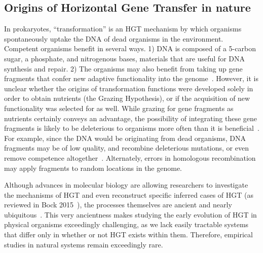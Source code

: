 \documentclass[letterpaper]{article}
\begin{document}
\subsection{Origins of Horizontal Gene Transfer in nature}
In prokaryotes, ``transformation'' is an HGT mechanism by which organisms spontaneously uptake the DNA of dead organisms in the environment. Competent organisms benefit in several ways. 1) DNA is composed of a 5-carbon sugar, a phosphate, and nitrogenous bases, materials that are useful for DNA synthesis and repair. 2) The organisms may also benefit from taking up gene fragments that confer new adaptive functionality into the genome~\cite{vos_why_2009}. However, it is unclear whether the origins of transformation functions were developed solely in order to obtain nutrients (the Grazing Hypothesis), or if the acquisition of new functionality was selected for as well. While grazing for gene fragments as nutrients certainly conveys an advantage, the possibility of integrating these gene fragments is likely to be deleterious to organisms more often than it is beneficial~\cite{redfield_evolution_1997}. For example, since the DNA would be originating from dead organisms, DNA fragments may be of low quality, and recombine deleterious mutations, or even remove competence altogether~\cite{redfield_evolution_1997}. Alternately, errors in homologous recombination may apply fragments to random locations in the genome.    

Although advances in molecular biology are allowing researchers to investigate the mechanisms of HGT and even reconstruct specific inferred cases of HGT (as reviewed in Bock 2015~\cite{bock_witnessing_2015}), the processes themselves are ancient and nearly ubiquitous~\cite{soucy_horizontal_2015}. This very ancientness makes studying the early evolution of HGT in physical organisms exceedingly challenging, as we lack easily tractable systems that differ only in whether or not HGT exists within them. Therefore, empirical studies in natural systems remain exceedingly rare.
\end{document}
